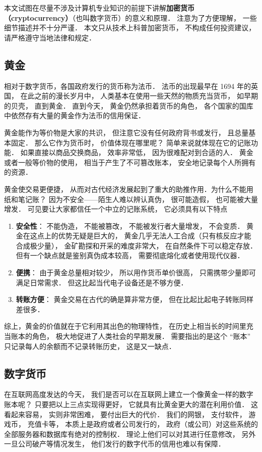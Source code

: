 
本文试图在尽量不涉及计算机专业知识的前提下讲解\textbf{加密货币（cryptocurrency）}（也叫数字货币）的意义和原理． 注意为了方便理解， 一些细节描述并不十分严谨． 本文只从技术上科普加密货币， 不构成任何投资建议， 请严格遵守当地法律和规定．

\subsection{黄金}
相对于数字货币，各国政府发行的货币称为法币． 法币的出现最早在 1694 年的英国， 在此之前的漫长岁月中， 人类基本在使用一些天然的物质充当货币， 如早期的贝壳， 直到黄金． 直到今天， 黄金仍然承担着货币的角色， 各个国家的国库中依然存有大量的黄金作为法币的信用保证．

黄金能作为等价物是大家的共识， 但注意它没有任何政府背书或发行， 且总量基本固定． 那么它作为货币时， 价值体现在哪里呢？ 简单来说就体现在它的记账功能． 如果直接以商品交换商品， 效率非常低， 因为很难配对到合适的人． 黄金或者一般等价物的使用， 相当于产生了不可篡改账本， 安全地记录每个人所拥有的资源．

黄金使交易更便捷， 从而对古代经济发展起到了重大的助推作用．为什么不能用纸和笔记账？ 因为不安全——陌生人难以辨认真伪， 很可能造假， 也可能被大量增发． 可见要让大家都信任一个中立的记账系统， 它必须具有以下特点
\begin{enumerate}
\item \textbf{安全性}： 不能伪造， 不能被篡改， 不能被发行者大量增发， 不会变质． 黄金在这点上的优势无疑是巨大的， 黄金几乎无法人工合成（只有核反应才能合成极少量）， 金矿勘探和开采的难度非常大， 在自然条件下可以稳定存放． 但有一个缺点就是鉴别真伪成本较高， 需要彻底熔化或者使用现代仪器．
\item \textbf{便携}： 由于黄金总量相对较少， 所以用作货币单价很高， 只需携带少量即可满足日常需求． 但这比起当代电子设备还是不够方便．
\item \textbf{转账方便}： 黄金交易在古代的确是算非常方便， 但在比起比起电子转账同样差很多．
\end{enumerate}

综上，黄金的价值就在于它利用其出色的物理特性， 在历史上相当长的时间里充当账本的角色， 极大地促进了人类社会的早期发展． 需要指出的是这个 “账本” 只记录每人的余额而不记录转账历史， 这是又一缺点．

\subsection{数字货币}
在互联网高度发达的今天， 我们是否可以在互联网上建立一个像黄金一样的数字账本呢？ 只要把以上三点实现得更好， 它就具有比黄金更大的潜在利用价值． 这看起来容易， 实则非常困难， 要付出巨大的代价． 我们的网银， 支付软件， 游戏币， 充值卡等， 本质上是政府或者公司发行的， 政府（或公司）对这些系统的全部服务器和数据库有绝对的控制权． 理论上他们可以对其进行任意修改， 另外一旦公司破产等情况发生， 他们发行的数字代币的信用也难以有保障．

